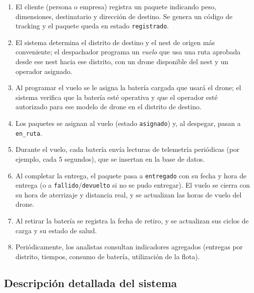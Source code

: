 \documentclass[11pt,a4paper]{article}
\newcommand{\at}[1]{\texttt{#1}}
\begin{document}
\begin{enumerate}
\item El cliente (persona o empresa) registra un paquete indicando peso, dimensiones, destinatario y dirección de destino. Se genera un código de tracking y el paquete queda en estado \at{registrado}.
\item El sistema determina el distrito de destino y el nest de origen más conveniente; el despachador programa un \emph{vuelo} que usa una ruta aprobada desde ese nest hacia ese distrito, con un drone disponible del nest y un operador asignado.
\item Al programar el vuelo se le asigna la batería cargada que usará el drone; el sistema verifica que la batería esté operativa y que el operador esté autorizado para ese modelo de drone en el distrito de destino.
\item Los paquetes se asignan al vuelo (estado \at{asignado}) y, al despegar, pasan a \at{en\_ruta}.
\item Durante el vuelo, cada batería envía lecturas de telemetría periódicas (por ejemplo, cada 5 segundos), que se insertan en la base de datos.
\item Al completar la entrega, el paquete pasa a \at{entregado} con su fecha y hora de entrega (o a \at{fallido}/\at{devuelto} si no se pudo entregar). El vuelo se cierra con su hora de aterrizaje y distancia real, y se actualizan las horas de vuelo del drone.
\item Al retirar la batería se registra la fecha de retiro, y se actualizan sus ciclos de carga y su estado de salud.
\item Periódicamente, los analistas consultan indicadores agregados (entregas por distrito, tiempos, consumo de batería, utilización de la flota).
\end{enumerate}

\subsection{Descripción detallada del sistema}
\end{document}
